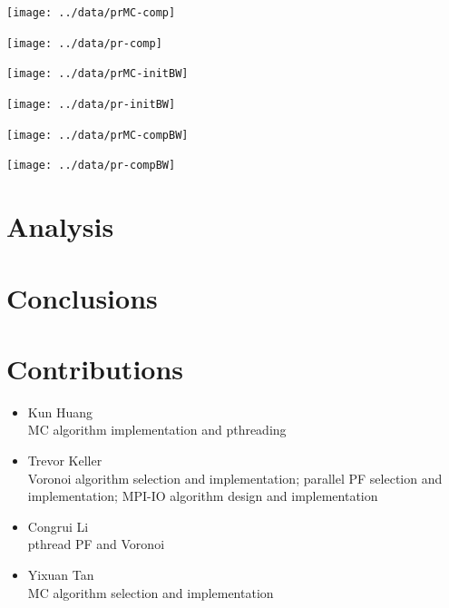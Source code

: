 \documentclass[11pt]{article}
\begin{document}
\begin{multicols*}{2}
\begin{center}
\begin{minipage}{0.4\textwidth}\centering
  \texttt{[image: ../data/prMC-comp]}
\end{minipage}
\begin{minipage}{0.4\textwidth}\centering
  \texttt{[image: ../data/pr-comp]}
\end{minipage}
\end{center}

\begin{center}
\begin{minipage}{0.4\textwidth}\centering
  \texttt{[image: ../data/prMC-initBW]}
\end{minipage}
\begin{minipage}{0.4\textwidth}\centering
  \texttt{[image: ../data/pr-initBW]}
\end{minipage}
\end{center}

\begin{center}
\begin{minipage}{0.4\textwidth}\centering
  \texttt{[image: ../data/prMC-compBW]}
\end{minipage}
\begin{minipage}{0.4\textwidth}\centering
  \texttt{[image: ../data/pr-compBW]}
\end{minipage}
\end{center}

\section{Analysis}


\section{Conclusions}


\section{Contributions}
\begin{itemize}
 \item Kun Huang\\
	MC algorithm implementation and pthreading
 \item Trevor Keller\\
	Voronoi algorithm selection and implementation; parallel PF selection and implementation; MPI-IO algorithm design and implementation
 \item Congrui Li\\
	pthread PF and Voronoi
 \item Yixuan Tan\\
	MC algorithm selection and implementation
\end{itemize}


\end{multicols*}
\end{document}
